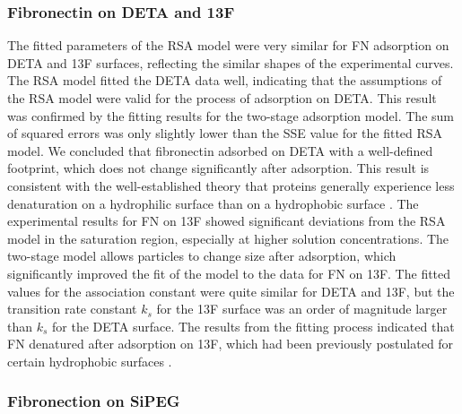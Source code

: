 \subsubsection{Fibronectin on DETA and 13F}

The fitted parameters of the RSA model were very similar for FN adsorption
on DETA and 13F surfaces, reflecting the similar shapes of the experimental
curves. The RSA model fitted the DETA data well, indicating that the
assumptions of the RSA model were valid for the process of adsorption
on DETA. This result was confirmed by the fitting results for the
two-stage adsorption model. The sum of squared errors was only slightly
lower than the SSE value for the fitted RSA model. We concluded that
fibronectin adsorbed on DETA with a well-defined footprint, which
does not change significantly after adsorption. This result is consistent
with the well-established theory that proteins generally experience
less denaturation on a hydrophilic surface than on a hydrophobic surface
\cite{Latour2005}. The experimental results for FN on 13F showed
significant deviations from the RSA model in the saturation region,
especially at higher solution concentrations. The two-stage model
allows particles to change size after adsorption, which significantly
improved the fit of the model to the data for FN on 13F. The fitted
values for the association constant were quite similar for DETA and
13F, but the transition rate constant $k_{s}$ for the 13F surface
was an order of magnitude larger than $k_{s}$ for the DETA surface.
The results from the fitting process indicated that FN denatured after
adsorption on 13F, which had been previously postulated for certain
hydrophobic surfaces \cite{Lan2005,Sivaraman2009}. 


\subsubsection{Fibronection on SiPEG}

